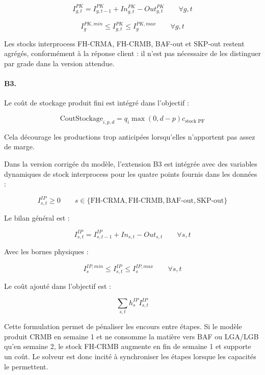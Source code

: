 \documentclass[12pt,a4paper]{article}
\newcommand{\question}[1]{\paragraph{\textcolor{blue!50!black}{#1.}}}
\begin{document}
\begin{equation}
I^{PK}_{g,t}=I^{PK}_{g,t-1}+In^{PK}_{g,t}-Out^{PK}_{g,t}
\qquad \forall g,t
\end{equation}

\begin{equation}
I^{PK,min}_{g}\leq I^{PK}_{g,t}\leq I^{PK,max}_{g}
\qquad \forall g,t
\end{equation}

Les stocks interprocess FH-CRMA, FH-CRMB, BAF-out et SKP-out restent agrégés, conformément à la réponse client : il n'est pas nécessaire de les distinguer par grade dans la version attendue.

\question{B3}
Le coût de stockage produit fini est intégré dans l'objectif :

\begin{equation}
\text{CoutStockage}_{i,p,d}
=q_i\max(0,d-p)c_{\text{stock PF}}
\end{equation}

Cela décourage les productions trop anticipées lorsqu'elles n'apportent pas assez de marge.

Dans la version corrigée du modèle, l'extension B3 est intégrée avec des variables dynamiques de stock interprocess pour les quatre points fournis dans les données :

\begin{equation}
I^{IP}_{s,t} \geq 0
\qquad s\in\{\text{FH-CRMA},\text{FH-CRMB},\text{BAF-out},\text{SKP-out}\}
\end{equation}

Le bilan général est :

\begin{equation}
I^{IP}_{s,t}=I^{IP}_{s,t-1}+In_{s,t}-Out_{s,t}
\qquad \forall s,t
\end{equation}

Avec les bornes physiques :

\begin{equation}
I^{IP,min}_{s}\leq I^{IP}_{s,t}\leq I^{IP,max}_{s}
\qquad \forall s,t
\end{equation}

Le coût ajouté dans l'objectif est :

\begin{equation}
\sum_{s,t} h^{IP}_{s} I^{IP}_{s,t}
\end{equation}

Cette formulation permet de pénaliser les encours entre étapes. Si le modèle produit CRMB en semaine 1 et ne consomme la matière vers BAF ou LGA/LGB qu'en semaine 2, le stock FH-CRMB augmente en fin de semaine 1 et supporte un coût. Le solveur est donc incité à synchroniser les étapes lorsque les capacités le permettent.
\end{document}
